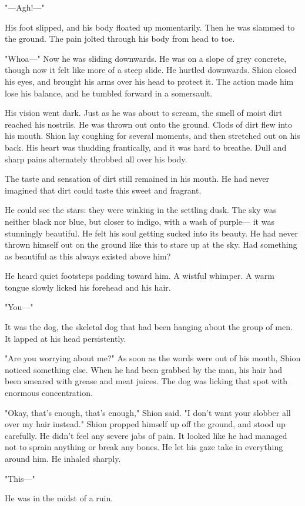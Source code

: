 "---Agh!---"

His foot slipped, and his body floated up momentarily. Then he was
slammed to the ground. The pain jolted through his body from head to
toe.

"Whoa---" Now he was sliding downwards. He was on a slope of grey
concrete, though now it felt like more of a steep slide. He hurtled
downwards. Shion closed his eyes, and brought his arms over his head to
protect it. The action made him lose his balance, and he tumbled forward
in a somersault.

His vision went dark. Just as he was about to scream, the smell of moist
dirt reached his nostrils. He was thrown out onto the ground. Clods of
dirt flew into his mouth. Shion lay coughing for several moments, and
then stretched out on his back. His heart was thudding frantically, and
it was hard to breathe. Dull and sharp pains alternately throbbed all
over his body.

The taste and sensation of dirt still remained in his mouth. He had
never imagined that dirt could taste this sweet and fragrant.

He could see the stars: they were winking in the settling dusk. The sky
was neither black nor blue, but closer to indigo, with a wash of purple---
it was stunningly beautiful. He felt his soul getting sucked into its
beauty. He had never thrown himself out on the ground like this to stare
up at the sky. Had something as beautiful as this always existed above
him?

He heard quiet footsteps padding toward him. A wistful whimper. A warm
tongue slowly licked his forehead and his hair.

"You---"

It was the dog, the skeletal dog that had been hanging about the group
of men. It lapped at his head persistently.

"Are you worrying about me?" As soon as the words were out of his mouth,
Shion noticed something else. When he had been grabbed by the man, his
hair had been smeared with grease and meat juices. The dog was licking
that spot with enormous concentration.

"Okay, that's enough, that's enough," Shion said. "I don't want your
slobber all over my hair instead." Shion propped himself up off the
ground, and stood up carefully. He didn't feel any severe jabs of pain.
It looked like he had managed not to sprain anything or break any bones.
He let his gaze take in everything around him. He inhaled sharply.

"This---"

He was in the midst of a ruin.